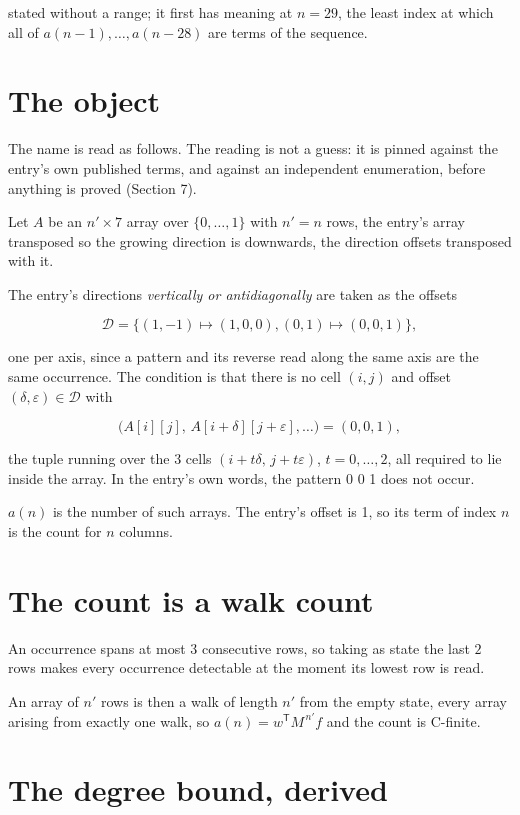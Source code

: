 \documentclass[11pt]{article}
\theoremstyle{definition}
\begin{document}
stated without a range; it first has meaning at $n = 29$, the least index at which all of $a(n-1),\dots,a(n-28)$ are terms of the sequence.

\section{The object}

The name is read as follows. The reading is not a guess: it is pinned against the entry's own published terms, and against an independent enumeration, before anything is proved (Section 7).

Let $A$ be an $n' \times 7$ array over $\{0,\dots,1\}$ with $n' = n$ rows, the entry's array transposed so the growing direction is downwards, the direction offsets transposed with it.

The entry's directions {\itshape vertically or antidiagonally} are taken as the offsets

\[\mathcal{D} = \{(1,-1)\mapsto(1,0,0), (0,1)\mapsto(0,0,1)\},\]

one per axis, since a pattern and its reverse read along the same axis are the same occurrence. The condition is that there is no cell $(i,j)$ and offset $(\delta,\varepsilon)\in\mathcal{D}$ with

\[\bigl(A[i][j],\,A[i{+}\delta][j{+}\varepsilon],\dots\bigr) = (0, 0, 1),\]

the tuple running over the $3$ cells $(i+t\delta,\,j+t\varepsilon)$, $t = 0,\dots,2$, all required to lie inside the array. In the entry's own words, the pattern 0 0 1 does not occur.

$a(n)$ is the number of such arrays. The entry's offset is 1, so its term of index $n$ is the count for $n$ columns.

\section{The count is a walk count}

An occurrence spans at most $3$ consecutive rows, so taking as state the last $2$ rows makes every occurrence detectable at the moment its lowest row is read.

An array of $n'$ rows is then a walk of length $n'$ from the empty state, every array arising from exactly one walk, so $a(n) = w^{\mathsf T}M^{\,n'}f$ and the count is C-finite.

\section{The degree bound, derived}
\end{document}
